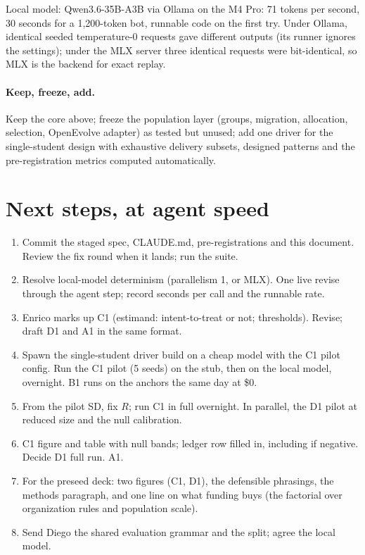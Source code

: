 \documentclass[11pt]{article}
\begin{document}
Local model: Qwen3.6-35B-A3B via Ollama on the M4 Pro: 71 tokens per second, 30 seconds for a 1,200-token bot,
runnable code on the first try. Under Ollama, identical seeded temperature-0 requests gave different outputs (its runner ignores the
settings); under the MLX server three identical requests were bit-identical, so MLX is the backend for exact replay.

\paragraph{Keep, freeze, add.} Keep the core above; freeze the population layer (groups, migration, allocation,
selection, OpenEvolve adapter) as tested but unused; add one driver for the single-student design with exhaustive
delivery subsets, designed patterns and the pre-registration metrics computed automatically.

\section{Next steps, at agent speed}\label{sec:next}

\begin{enumerate}
\item Commit the staged spec, CLAUDE.md, pre-registrations and this document. Review the fix round when it lands;
run the suite.
\item Resolve local-model determinism (parallelism 1, or MLX). One live revise through the agent step; record
seconds per call and the runnable rate.
\item Enrico marks up C1 (estimand: intent-to-treat or not; thresholds). Revise; draft D1 and A1 in the same
format.
\item Spawn the single-student driver build on a cheap model with the C1 pilot config. Run the C1 pilot (5 seeds) on
the stub, then on the local model, overnight. B1 runs on the anchors the same day at \$0.
\item From the pilot SD, fix $R$; run C1 in full overnight. In parallel, the D1 pilot at reduced size and the null
calibration.
\item C1 figure and table with null bands; ledger row filled in, including if negative. Decide D1 full run. A1.
\item For the preseed deck: two figures (C1, D1), the defensible phrasings, the methods paragraph, and one line on
what funding buys (the factorial over organization rules and population scale).
\item Send Diego the shared evaluation grammar and the split; agree the local model.
\end{enumerate}
\end{document}
